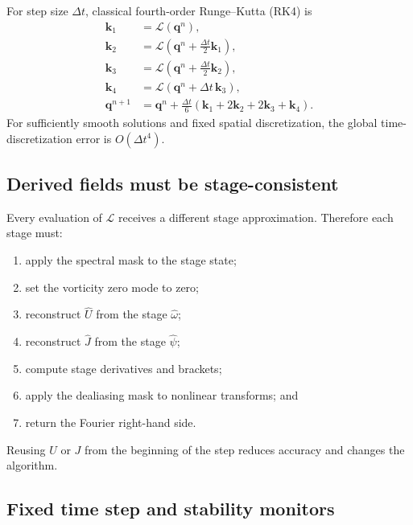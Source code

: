 \documentclass[11pt]{article}
\newcommand{\vect}[1]{\bm{#1}}
\begin{document}
For step size $\Delta t$, classical fourth-order Runge--Kutta (RK4) is
\begin{align}
\vect{k}_1&=\vect{\mathcal{L}}(\vect{q}^n),\\
\vect{k}_2&=\vect{\mathcal{L}}
\left(\vect{q}^n+\frac{\Delta t}{2}\vect{k}_1\right),\\
\vect{k}_3&=\vect{\mathcal{L}}
\left(\vect{q}^n+\frac{\Delta t}{2}\vect{k}_2\right),\\
\vect{k}_4&=\vect{\mathcal{L}}
\left(\vect{q}^n+\Delta t\,\vect{k}_3\right),\\
\vect{q}^{n+1}
&=\vect{q}^n+\frac{\Delta t}{6}
\left(\vect{k}_1+2\vect{k}_2+2\vect{k}_3+\vect{k}_4\right).
\label{eq:rk4}
\end{align}
For sufficiently smooth solutions and fixed spatial discretization, the global time-discretization error is $O(\Delta t^4)$.

\subsection{Derived fields must be stage-consistent}

Every evaluation of $\vect{\mathcal{L}}$ receives a different stage approximation. Therefore each stage must:
\begin{enumerate}[label=\arabic*.]
  \item apply the spectral mask to the stage state;
  \item set the vorticity zero mode to zero;
  \item reconstruct $\widehat U$ from the stage $\widehat\omega$;
  \item reconstruct $\widehat J$ from the stage $\widehat\psi$;
  \item compute stage derivatives and brackets;
  \item apply the dealiasing mask to nonlinear transforms; and
  \item return the Fourier right-hand side.
\end{enumerate}
Reusing $U$ or $J$ from the beginning of the step reduces accuracy and changes the algorithm.

\subsection{Fixed time step and stability monitors}
\end{document}
